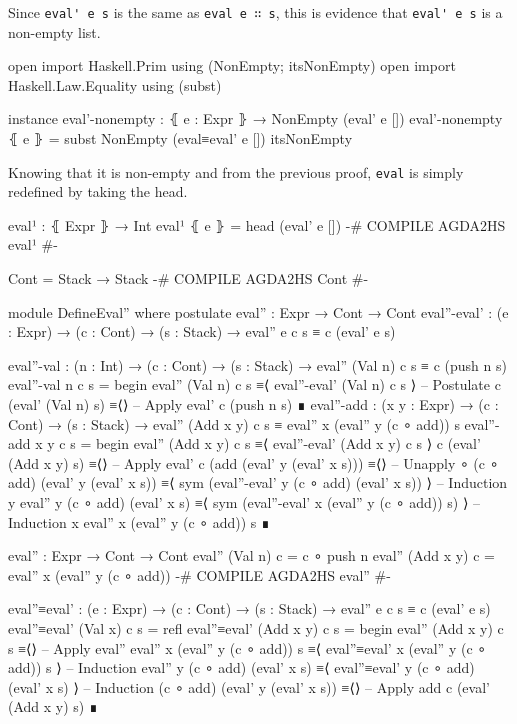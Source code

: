 \documentclass{article}
\begin{document}
Since \verb!eval' e s! is the same as \verb!eval e ∷ s!, this is evidence that \verb!eval' e s! is a non-empty list.

\begin{code}
open import Haskell.Prim using (NonEmpty; itsNonEmpty)
open import Haskell.Law.Equality using (subst)

instance
  eval'-nonempty : ⦃ e : Expr ⦄ → NonEmpty (eval' e [])
  eval'-nonempty ⦃ e ⦄ = subst NonEmpty (eval≡eval' e []) itsNonEmpty
\end{code}

Knowing that it is non-empty and from the previous proof, \texttt{eval} is simply redefined by taking the head.

\begin{code}
eval¹ : ⦃ Expr ⦄ → Int
eval¹ ⦃ e ⦄ = head (eval' e [])
{-# COMPILE AGDA2HS eval¹ #-}
\end{code}
\begin{code}
Cont = Stack → Stack
{-# COMPILE AGDA2HS Cont #-}

module DefineEval'' where
  postulate
    eval'' : Expr → Cont → Cont
    eval''-eval' : (e : Expr) → (c : Cont) → (s : Stack)
      → eval'' e c s ≡ c (eval' e s)

  eval''-val : (n : Int) → (c : Cont) → (s : Stack)
    → eval'' (Val n) c s ≡ c (push n s)
  eval''-val n c s =
    begin
      eval'' (Val n) c s
    ≡⟨ eval''-eval' (Val n) c s ⟩ -- Postulate
      c (eval' (Val n) s)
    ≡⟨⟩ -- Apply eval'
      c (push n s)
    ∎
  eval''-add : (x y : Expr) → (c : Cont) → (s : Stack)
    → eval'' (Add x y) c s ≡ eval'' x (eval'' y (c ∘ add)) s
  eval''-add x y c s =
    begin
      eval'' (Add x y) c s
    ≡⟨ eval''-eval' (Add x y) c s ⟩
      c (eval' (Add x y) s)
    ≡⟨⟩ -- Apply eval'
      c (add (eval' y (eval' x s)))
    ≡⟨⟩ -- Unapply ∘
      (c ∘ add) (eval' y (eval' x s))
    ≡⟨ sym (eval''-eval' y (c ∘ add) (eval' x s)) ⟩ -- Induction y
      eval'' y (c ∘ add) (eval' x s)
    ≡⟨ sym (eval''-eval' x (eval'' y (c ∘ add)) s) ⟩ -- Induction x
      eval'' x (eval'' y (c ∘ add)) s
    ∎
\end{code}
\begin{code}
eval'' : Expr → Cont → Cont
eval'' (Val n) c = c ∘ push n
eval'' (Add x y) c = eval'' x (eval'' y (c ∘ add))
{-# COMPILE AGDA2HS eval'' #-}

eval''≡eval' : (e : Expr) → (c : Cont) → (s : Stack)
  → eval'' e c s ≡ c (eval' e s)
eval''≡eval' (Val x) c s = refl
eval''≡eval' (Add x y) c s =
  begin
    eval'' (Add x y) c s
  ≡⟨⟩ -- Apply eval''
    eval'' x (eval'' y (c ∘ add)) s
  ≡⟨ eval''≡eval' x (eval'' y (c ∘ add)) s ⟩ -- Induction
    eval'' y (c ∘ add) (eval' x s)
  ≡⟨ eval''≡eval' y (c ∘ add) (eval' x s) ⟩ -- Induction
    (c ∘ add) (eval' y (eval' x s))
  ≡⟨⟩ -- Apply add
    c (eval' (Add x y) s)
  ∎
\end{code}
\end{document}
